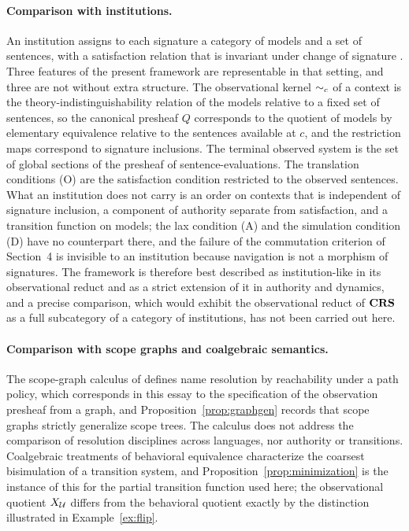 \paragraph{Comparison with institutions.} An institution assigns to each signature a category of models and a set of sentences, with a satisfaction relation that is invariant under change of signature \cite{goguen}. Three features of the present framework are representable in that setting, and three are not without extra structure. The observational kernel $\sim_c$ of a context is the theory-indistinguishability relation of the models relative to a fixed set of sentences, so the canonical presheaf $Q$ corresponds to the quotient of models by elementary equivalence relative to the sentences available at $c$, and the restriction maps correspond to signature inclusions. The terminal observed system is the set of global sections of the presheaf of sentence-evaluations. The translation conditions (O) are the satisfaction condition restricted to the observed sentences. What an institution does not carry is an order on contexts that is independent of signature inclusion, a component of authority separate from satisfaction, and a transition function on models; the lax condition (A) and the simulation condition (D) have no counterpart there, and the failure of the commutation criterion of Section~4 is invisible to an institution because navigation is not a morphism of signatures. The framework is therefore best described as institution-like in its observational reduct and as a strict extension of it in authority and dynamics, and a precise comparison, which would exhibit the observational reduct of $\mathbf{CRS}$ as a full subcategory of a category of institutions, has not been carried out here.

\paragraph{Comparison with scope graphs and coalgebraic semantics.} The scope-graph calculus of \cite{scopegraphs} defines name resolution by reachability under a path policy, which corresponds in this essay to the specification of the observation presheaf from a graph, and Proposition~\ref{prop:graphgen} records that scope graphs strictly generalize scope trees. The calculus does not address the comparison of resolution disciplines across languages, nor authority or transitions. Coalgebraic treatments of behavioral equivalence \cite{sangiorgi} characterize the coarsest bisimulation of a transition system, and Proposition~\ref{prop:minimization} is the instance of this for the partial transition function used here; the observational quotient $X_{\mathcal U}$ differs from the behavioral quotient exactly by the distinction illustrated in Example~\ref{ex:flip}.

